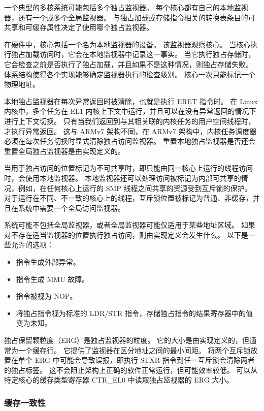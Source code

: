 一个典型的多核系统可能包括多个独占监视器。
每个核心都有自己的本地监视器，还有一个或多个全局监视器。
与独占加载或存储指令相关的转换表条目的可共享和可缓存属性决定了使用哪个独占监视器。

在硬件中，核心包括一个名为本地监视器的设备。
该监视器观察核心。
当核心执行独占加载访问时，它会在本地监视器中记录这一事实。
当它执行独占存储时，它会检查之前是否执行了独占加载，并且如果不是这种情况，则独占存储失败。
体系结构使得各个实现能够确定监视器执行的检查级别。
核心一次只能标记一个物理地址。

本地独占监视器在每次异常返回时被清除，也就是执行 ERET 指令时。
在 Linux 内核中，多个任务在 EL1 内核上下文中运行，并且可以在没有异常返回的情况下进行上下文切换。
只有当我们返回到与其相关联的内核任务的用户空间线程时，才执行异常返回。
这与 ARMv7 架构不同，在 ARMv7 架构中，内核任务调度器必须在每次任务切换时显式清除独占访问监视器。
重置本地独占监视器是否还会重置全局独占监视器是由实现定义的。

当用于独占访问的位置标记为不可共享时，即只能由同一核心上运行的线程访问时，会使用本地监视器。
本地监视器还可以处理访问被标记为内部可共享的情况，例如，在任何核心上运行的 SMP 线程之间共享的资源受到互斥锁的保护。
对于运行在不同、不一致的核心上的线程，互斥锁位置被标记为普通、非缓存，并且在系统中需要一个全局访问监视器。

系统可能不包括全局监视器，或者全局监视器可能仅适用于某些地址区域。
如果对不存在适当监视器的位置执行独占访问，则由实现定义会发生什么。
以下是一些允许的选项：

\begin{itemize}
\item
  指令生成外部异常。
\item
  指令生成 MMU 故障。
\item
  指令被视为 NOP。
\item
  将独占指令视为标准的 LDR/STR
  指令，存储独占指令的结果寄存器中的值变为未知。
\end{itemize}

独占保留颗粒度（ERG）是独占监视器的粒度。
它的大小是由实现定义的，但通常为一个缓存行。
它提供了监视器在区分地址之间的最小间距。
将两个互斥锁放置在单个 ERG 中可能会导致误报，即执行 STXR 指令到任一互斥锁会清除两者的独占标签。
这不会阻止架构上正确的软件正常运行，但可能效率较低。
可以从特定核心的缓存类型寄存器 CTR\_EL0 中读取独占监视器的 ERG 大小。

\subsubsection{缓存一致性}

